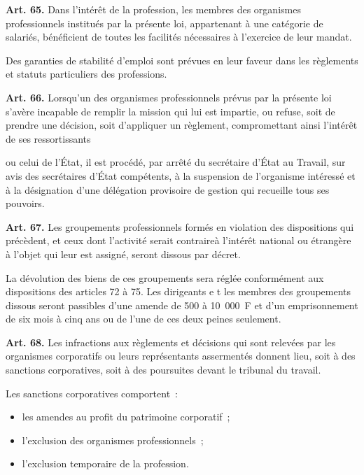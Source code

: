\documentclass[french,twoside]{book} %
\newcommand{\labelchar}[1]{\textbf{\color{rubric} #1}}
\begin{document}
\noindent \labelchar{Art. 65.} Dans l’intérêt de la profession, les membres des organismes professionnels institués par la présente loi, appartenant à une catégorie de salariés, bénéficient de toutes les facilités nécessaires à l’exercice de leur mandat.\par
Des garanties de stabilité d’emploi sont prévues en leur faveur dans les règlements et statuts particuliers des professions.\par
\bigbreak
\noindent \labelchar{Art. 66.} Lorsqu’un des organismes professionnels prévus par la présente loi s’avère incapable de remplir la mission qui lui est impartie, ou refuse, soit de prendre une décision, soit d’appliquer un règlement, compromettant ainsi l’intérêt de ses ressortissants\par
ou celui de l’État, il est procédé, par arrêté du secrétaire d’État au Travail, sur avis des secrétaires d’État compétents, à la suspension de l’organisme intéressé et à la désignation d’une délégation provisoire de gestion qui recueille tous ses pouvoirs.\par
\bigbreak
\noindent \labelchar{Art. 67.} Les groupements professionnels formés en violation des dispositions qui précèdent, et ceux dont l’activité serait contraireà l’intérêt national ou étrangère à l’objet qui leur est assigné, seront dissous par décret.\par
La dévolution des biens de ces groupements sera réglée conformément aux dispositions des articles 72 à 75. Les dirigeants e t les membres des groupements dissous seront passibles d’une amende de 500 à 10 000 F et d’un emprisonnement de six mois à cinq ans ou de l’une de ces deux peines seulement.\par
\bigbreak
\noindent \labelchar{Art. 68.} Les infractions aux règlements et décisions qui sont relevées par les organismes corporatifs ou leurs représentants assermentés donnent lieu, soit à des sanctions corporatives, soit à des poursuites devant le tribunal du travail.\par
Les sanctions corporatives comportent :\par

\begin{itemize}[itemsep=0pt,]
\item les amendes au profit du patrimoine corporatif ;
\item l’exclusion des organismes professionnels ;
\item l’exclusion temporaire de la profession.
\end{itemize}
\end{document}
